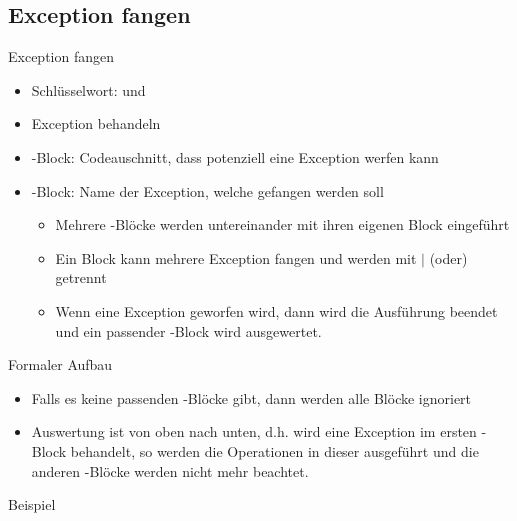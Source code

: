 \documentclass{../tuda-beamer}
\begin{document}
    \subsection{Exception fangen}
    \label{subsec:exception-fangen}
    \begin{frame}[c]{Exception fangen}
        \begin{itemize}
            \item Schlüsselwort:  und 
            \item Exception behandeln
            \item {}-Block: Codeauschnitt, dass potenziell eine Exception werfen kann
            \item {}-Block: Name der Exception, welche gefangen werden soll

            \begin{itemize}
                \item Mehrere -Blöcke werden untereinander mit ihren eigenen
                Block eingeführt
                \item Ein Block kann mehrere Exception fangen und werden mit \(\vert\) (oder)
                getrennt
                \item Wenn eine Exception geworfen wird, dann wird die Ausführung beendet und ein
                passender -Block wird ausgewertet.
            \end{itemize}
        \end{itemize}
    \end{frame}

    \begin{frame}[c]{Formaler Aufbau}
        \begin{itemize}
            \item Falls es keine passenden -Blöcke gibt, dann werden alle
            Blöcke ignoriert
            \item Auswertung ist von oben nach unten, d.h. wird eine Exception im ersten
            -Block behandelt, so werden die Operationen in dieser ausgeführt und
            die anderen -Blöcke werden nicht mehr beachtet.
        \end{itemize}
        
    \end{frame}

    \begin{frame}[c]{Beispiel}
        
    \end{frame}
\end{document}
